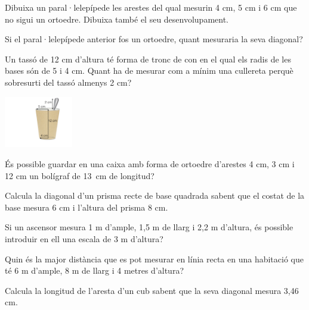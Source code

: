 \begin{activitats}
\begin{mylist}
\exer Dibuixa un paral·lelepípede les arestes del qual mesurin 4 cm, 5 cm i 6 cm que no sigui un ortoedre. Dibuixa també el seu desenvolupament.


\exer  Si el paral·lelepípede anterior fos un ortoedre, quant mesuraria la seva diagonal? 


\exer  Un tassó de 12 cm d'altura té forma de tronc de con en el qual els radis de les bases són de 5 i 4 cm. Quant ha de mesurar com a mínim una cullereta perquè sobresurti del tassó almenys 2 cm?

\begin{center}
\includegraphics[width=3cm]{img-11/tasso}
\end{center}

\answers{17 cm}

\exer  És possible guardar en una caixa amb forma de ortoedre d'arestes 4 cm, 3 cm i 12 cm un bolígraf de 13~cm de longitud?



\exer  Calcula la diagonal d'un prisma recte de base quadrada sabent que el costat de la base mesura 6 cm i l'altura del prisma 8 cm.


\exer  Si un ascensor mesura 1 m d'ample, 1,5 m de llarg i 2,2 m d'altura, és possible introduir en ell una escala de 3 m d'altura?


\exer  Quin és la major distància que es pot mesurar en línia recta en una habitació que té 6 m d'ample, 8 m de llarg i 4 metres d'altura?


\exer  Calcula la longitud de l'aresta d'un cub sabent que la seva diagonal mesura 3,46 cm.



\end{mylist}
\end{activitats}
